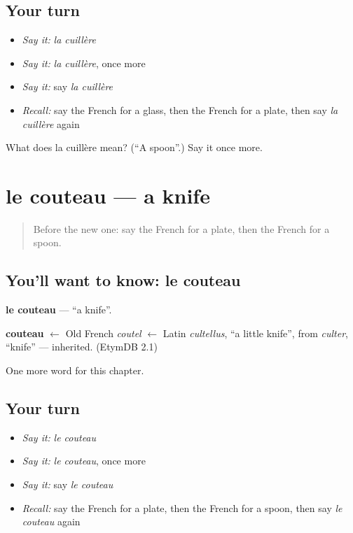 \subsection*{Your turn}
\begin{itemize}
\raggedright
  \item \emph{Say it:} \emph{la cuillère}
  \item \emph{Say it:} \emph{la cuillère}, once more
  \item \emph{Say it:} say \emph{la cuillère}
  \item \emph{Recall:} say the French for a glass, then the French for a plate, then say \emph{la cuillère} again
\end{itemize}

\begin{tcolorbox}[breakable,colback=teal!4,colframe=teal!35!black,title={Before you move on}]
What does la cuillère mean? (\textquotedblleft{}A spoon\textquotedblright{}.) Say it once more.
\end{tcolorbox}
\section[le couteau]{le couteau — a knife}

\label{lesson:FR-C77-couteau}



\begin{quote}
Before the new one: say the French for a plate, then the French for a spoon.
\end{quote}

\subsection*{You'll want to know: le couteau}
\textbf{le couteau} — \textquotedblleft{}a knife\textquotedblright{}.

\begin{cousinweb}
\textbf{couteau} $\leftarrow$ Old French \emph{coutel} $\leftarrow$ Latin \emph{cultellus}, \textquotedblleft{}a little knife\textquotedblright{}, from \emph{culter}, \textquotedblleft{}knife\textquotedblright{} — inherited. (EtymDB 2.1)
\end{cousinweb}

\begin{grammarlens}[title={What you've built}]
One more word for this chapter.
\end{grammarlens}

\subsection*{Your turn}
\begin{itemize}
\raggedright
  \item \emph{Say it:} \emph{le couteau}
  \item \emph{Say it:} \emph{le couteau}, once more
  \item \emph{Say it:} say \emph{le couteau}
  \item \emph{Recall:} say the French for a plate, then the French for a spoon, then say \emph{le couteau} again
\end{itemize}

